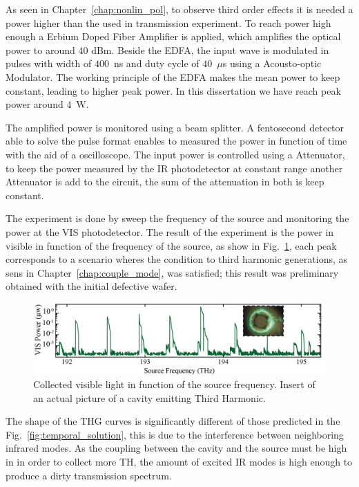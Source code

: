 As seen in Chapter~\ref{chap:nonlin_pol}, to observe third order effects it is needed a power higher than the used in transmission experiment. To reach power high enough a Erbium Doped Fiber Amplifier is applied, which amplifies the optical power to around $40$ dBm. Beside the EDFA, the input wave is modulated in pulses with width of $400$~ns and duty cycle of $40$~$\mu$s using a Acousto-optic Modulator. The working principle of the EDFA makes the mean power to keep constant, leading to higher peak power. In this dissertation we have reach peak power around $4$~W.  

The amplified power is monitored using a beam splitter. A fentosecond detector able to solve the pulse format enables to measured the power in function of time with the aid of a oscilloscope. The input power is controlled using a Attenuator, to keep the power measured by the IR photodetector at constant range another Attenuator is add to the circuit, the sum of the attenuation in both is keep constant.  

The experiment is done by sweep the frequency of the source and monitoring the power at the VIS photodetector. The result of the experiment is the power in visible in function of the frequency of the source, as show in Fig.~\ref{fig:thg_broad_map}, each peak corresponds to a scenario wheres the condition to third harmonic generations, as sens in Chapter~\ref{chap:couple_mode}, was satisfied; this result was preliminary obtained with the initial defective wafer. 
\begin{figure}[h]
    \centering
    \includegraphics[width = 16cm]{figuras/Dissertation_thg_broad.jpg}
    \caption{Collected visible light in function of the source frequency. Insert of an actual picture of a cavity emitting Third Harmonic.}
    \label{fig:thg_broad_map}
\end{figure}

The shape of the THG curves is significantly different of those predicted in the Fig.~\ref{fig:temporal_solution}, this is due to the interference between neighboring infrared modes. As the coupling between the cavity and the source must be high in in order to collect more TH, the amount of excited IR modes is high enough to produce a dirty transmission spectrum. 

